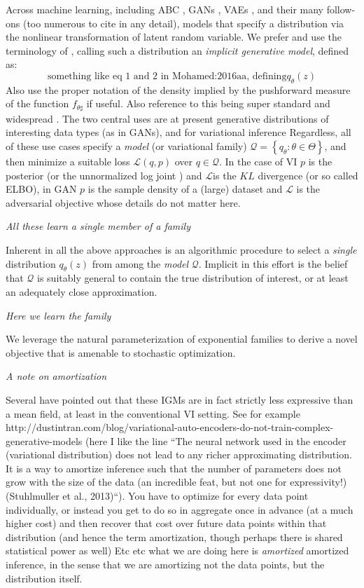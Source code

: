\documentclass{article}
\begin{document}
  Across machine learning, including ABC \cite{guttman2014statistical} , GANs \cite{Goodfellow:2014aa}, VAEs \cite{Kingma:2013aa, rezende2014stochastic}, and their many follow-ons (too numerous to cite in any detail), models that specify a distribution via the nonlinear transformation of latent random variable.  We prefer and use the terminology  of \cite{Mohamed:2016aa}, calling such a distribution an \emph{implicit generative model}, defined as:
   $$ \textrm{something like eq 1 and 2 in Mohamed:2016aa, defining}  q_\theta (z) $$
 Also use the proper notation of the density implied by the pushforward measure of the function $f_{\theta\sharp}$ if useful.  Also reference to this being super standard and widespread \cite{Devroye:1986aa}.
 The two central uses are at present generative distributions of interesting data types (as in GANs), and for variational inference
 Regardless, all of these use cases specify a \emph{model} (or variational family) $\mathcal{Q} = \left\{ q_\theta : \theta \in \Theta\right\}$, and then minimize a suitable loss $\mathcal{L}( q , p)$ over $q \in \mathcal{Q}$.   In the case of VI $p$ is the posterior (or the unnormalized log joint ) and $\mathcal{L}$is the $KL$ divergence (or so called ELBO), in GAN $p$ is the sample density of a (large) dataset and $\mathcal{L}$ is the adversarial objective whose details do not matter here.
 
 \emph{All these learn a single member of a family}
 
 Inherent in all the above approaches is an algorithmic procedure to select a \emph{single} distribution $q_\theta(z)$ from among the \emph{model} $\mathcal{Q}$.  Implicit in this effort is the belief that $\mathcal{Q}$ is suitably general to contain the true distribution of interest, or at least an adequately close approximation.
 
 \emph{Here we learn the family}
 
 We leverage the natural parameterization of exponential families to derive a novel objective that is amenable to stochastic optimization.
 
 \emph{A note on amortization}
 
 Several have pointed out that these IGMs are in fact strictly less expressive than a mean field, at least in the conventional VI setting.  See for example http://dustintran.com/blog/variational-auto-encoders-do-not-train-complex-generative-models  (here I like the line ``The neural network used in the encoder (variational distribution) does not lead to any richer approximating distribution. It is a way to amortize inference such that the number of parameters does not grow with the size of the data (an incredible feat, but not one for expressivity!) (Stuhlmuller et al., 2013)``).
 You have to optimize for every data point individually, or instead you get to do so in aggregate once in advance (at a much higher cost) and then recover that cost over future data points within that distribution (and hence the term amortization, though perhaps there is shared statistical power as well)
 Etc etc what we are doing here is \emph{amortized} amortized inference, in the sense that we are amortizing not the data points, but the distribution itself.
 
\end{document}
